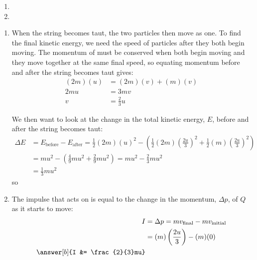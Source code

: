 
\begin{problem}[A1986MIIQ1p] %
{
\begin{enumerate}
	\item {}
	\item {}
\end{enumerate}
}
{}
{\begin{enumerate}
	\item When the string becomes taut, the two particles then move as one. To find the final kinetic energy, we need the speed of particles after they both begin moving. The momentum of  must be conserved when both begin moving and they move together at the same final speed, so equating momentum before and after the string becomes taut gives:
\begin{eqnarray*} 
(2m)(u) &= (2m)(v) + (m)(v) \\ 2mu &= 3mv \\ v &= \frac{2}{3} u 
\end{eqnarray*}

We then want to look at the change in the total kinetic energy, $E$, before and after the string becomes taut:
\begin{eqnarray*} 
\Delta E &=  E_{\textrm{before}} - E_{\textrm{after}} = \frac{1}{2}(2m)(u)^{2} - \left( \frac{1}{2}(2m)\left(\frac{2u}{3}\right)^{2} + \frac{1}{2}(m)\left(\frac{2u}{3}\right)^{2} \right) \\ 
&= mu^{2} - \left( \frac{4}{9}mu^{2} + \frac{2}{9}mu^{2} \right) = mu^{2} - \frac{2}{3}mu^{2} \\ 
&= \frac{1}{3}mu^{2}
\end{eqnarray*}
so 
	\item The impulse that acts on  is equal to the change in the momentum, $\Delta p$, of $Q$ as it starts to move:
\begin{eqnarray*} 
I &= \Delta p = mv_{\textrm{final}} - mv_{\textrm{initial}}\\ &= (m)\left( \frac{2u}{3} \right) - (m)(0)\\ 
\answer[b]{I &= \frac{2}{3}mu}
\end{eqnarray*}
\end{enumerate}
}
\end{problem}